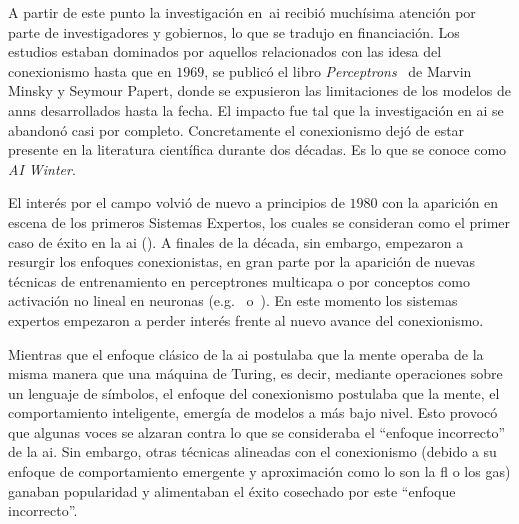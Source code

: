 A partir de este punto la investigación en~\ac{ai} recibió muchísima atención por parte de investigadores y gobiernos, lo que se tradujo en financiación. Los estudios estaban dominados por aquellos relacionados con las idesa del conexionismo hasta que en $1969$, se publicó el libro \textit{Perceptrons}~\cite{minsky1969perceptrons} de Marvin Minsky y Seymour Papert, donde se expusieron las limitaciones de los modelos de \acp{ann} desarrollados hasta la fecha. El impacto fue tal que la investigación en \gls{ai} se abandonó casi por completo. Concretamente el conexionismo dejó de estar presente en la literatura científica durante dos décadas. Es lo que se conoce como \textit{AI Winter}.

El interés por el campo volvió de nuevo a principios de $1980$ con la aparición en escena de los primeros Sistemas Expertos, los cuales se consideran como el primer caso de éxito en la \gls{ai}  (\cite{russell2003artificial}). A finales de la década, sin embargo, empezaron a resurgir los enfoques conexionistas, en gran parte por la aparición de nuevas técnicas de entrenamiento en perceptrones multicapa o por conceptos como activación no lineal en neuronas (e.g.~\cite{rumelhart1985learning} o~\cite{cybenko1989approximation}). En este momento los sistemas expertos empezaron a perder interés frente al nuevo avance del conexionismo.

Mientras que el enfoque clásico de la \ac{ai} postulaba que la mente operaba de la misma manera que una máquina de Turing, es decir, mediante operaciones sobre un lenguaje de símbolos, el enfoque del conexionismo postulaba que la mente, el comportamiento inteligente, emergía de modelos a más bajo nivel. Esto provocó que algunas voces se alzaran contra lo que se consideraba el \enquote{enfoque incorrecto} de la \ac{ai}. Sin embargo, otras técnicas alineadas con el conexionismo (debido a su enfoque de comportamiento emergente y aproximación como lo son la \ac{fl} o los \acp{ga}) ganaban popularidad y alimentaban el éxito cosechado por este \enquote{enfoque incorrecto}.

